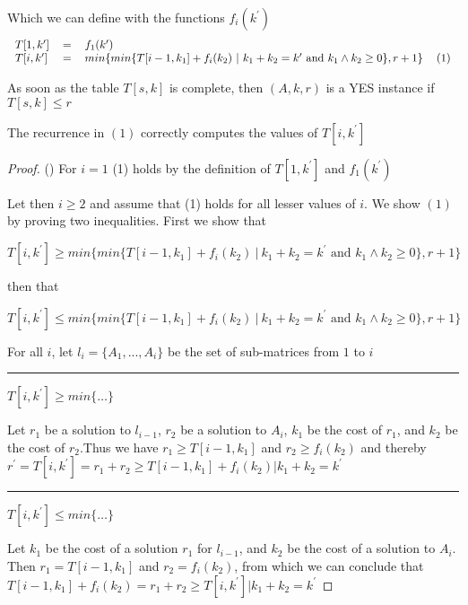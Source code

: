\documentclass[a4paper]{article}
\begin{document}
Which we can define with the functions $f_i(k^\prime)$
\[
    \begin{tabular}{lclc}
        $T[1, k^\prime]$ & $=$ & $f_1(k^\prime)$ &                                                                                              \\
        $T[i, k^\prime]$ & $=$ & $min\{ min\{ T[ i-1, k_1 ] + f_i(k_2) ~|~ k_1 + k_2 = k^\prime \text{~and~} k_1 \wedge k_2 \geq 0\}, r+1 \}$ & (1)
    \end{tabular}
\]

As soon as the table $T[s,k]$ is complete, then $(A,k,r)$ is a YES instance if $T[s,k] \leq r$

\begin{theoremlemma}{\label{lem:reconst}}
    The recurrence in $(1)$ correctly computes the values of $T[i,k^\prime]$
\end{theoremlemma}

\begin{proof}{()}
    For $i=1$ (1) holds by the definition of $T[1,k^\prime]$ and $f_1(k^\prime)$

    Let then $i \geq 2$ and assume that (1) holds for all lesser values of $i$. We show $(1)$
    by proving two inequalities. First we show that 

    $T[i, k^\prime] \geq min\{ min\{ T[ i-1, k_1 ] + f_i(k_2) ~|~ k_1 + k_2 = k^\prime \text{~and~} k_1 \wedge k_2 \geq 0\}, r+1 \}$
    
    then that

    $T[i, k^\prime] \leq min\{ min\{ T[ i-1, k_1 ] + f_i(k_2) ~|~ k_1 + k_2 = k^\prime \text{~and~} k_1 \wedge k_2 \geq 0\}, r+1 \}$

    \hfill

    For all $i$, let $l_i = \{A_1, ..., A_{i}\}$ be the set of sub-matrices from $1$ to $i$
    
    \noindent\rule{\textwidth}{1pt}
    $T[i, k^\prime] \geq min\{\dots\}$

    Let $r_1$ be a solution to $l_{i-1}$, $r_2$ be a solution to $A_i$, $k_1$ be the cost of $r_1$, and $k_2$ be the cost
    of $r_2$.Thus we have $r_1 \geq T[i-1,k_1]$ and $r_2 \geq f_i(k_2)$ and thereby
    $r^\prime = T[i,k^\prime] = r_1+r_2 \geq T[i-1,k_1] + f_i(k_2) | k_1+k_2 = k^\prime$
    
    \noindent\rule{\textwidth}{1pt}
    $T[i, k^\prime] \leq min\{\dots\}$

    Let $k_1$ be the cost of a solution $r_1$ for $l_{i-1}$, and $k_2$ be the cost of a solution to $A_i$. Then 
    $r_1 = T[i-1,k_1]$ and $r_2 = f_i(k_2)$, from which we can conclude that
    $T[i-1,k_1] + f_i(k_2) = r_1+r_2 \geq T[i,k^\prime] | k_1+k_2 = k^\prime$
    
\end{proof}
\end{document}
